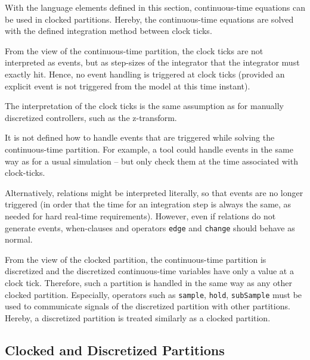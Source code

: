 With the language elements defined in this section, continuous-time equations can be used in clocked partitions.
Hereby, the continuous-time equations are solved with the defined integration method between clock ticks.

From the view of the continuous-time partition, the clock ticks are not interpreted as events, but as step-sizes of the integrator that the integrator must exactly hit.
Hence, no event handling is triggered at clock ticks (provided an explicit event is not triggered from the model at this time instant).

\begin{nonnormative}
The interpretation of the clock ticks is the same assumption as for manually discretized controllers, such as the z-transform.
\end{nonnormative}

\begin{nonnormative}
It is not defined how to handle events that are triggered while solving the continuous-time partition.
For example, a tool could handle events in the same way as for a usual simulation -- but only check them at the time associated with clock-ticks.

Alternatively, relations might be interpreted literally, so that events are no longer triggered (in order that the time for an integration step is always the same, as needed for hard real-time requirements).
However, even if relations do not generate events, when-clauses and operators \lstinline!edge! and \lstinline!change! should behave as normal.
\end{nonnormative}

From the view of the clocked partition, the continuous-time partition is discretized and the discretized continuous-time variables have only a value at a clock tick.
Therefore, such a partition is handled in the same way as any other clocked partition.
Especially, operators such as \lstinline!sample!, \lstinline!hold!, \lstinline!subSample! must be used to communicate signals of the discretized partition with other partitions.
Hereby, a discretized partition is treated similarly as a clocked partition.


\subsection{Clocked and Discretized Partitions}\label{clocked-discrete-time-and-clocked-discretized-continuous-time-partition}\label{clocked-and-discretized-partition}

